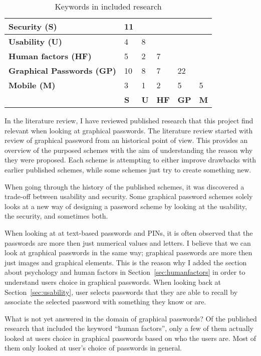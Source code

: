   \begin{table}[H]
      \centering
      \begin{tabular}{| p{4.7cm} | p{1cm} | p{1cm} | p{1cm} | p{1cm} | p{1cm} |}
        \hline
        {\bf Security (S)} & 11 & & & & \\ \hline
        {\bf Usability (U)} & 4 & 8 & & & \\ \hline
        {\bf Human factors (HF)} & 5 & 2 & 7 & & \\ \hline
        {\bf Graphical Passwords (GP)} & 10 & 8 & 7 & 22 & \\ \hline
        {\bf Mobile (M)} & 3 & 1 & 2 & 5 & 5 \\ \hline
         & {\bf S} & {\bf U} & {\bf HF} & {\bf GP} & {\bf M} \\ \hline
      \end{tabular}
      \caption{Keywords in included research}
      \label{tab:frequencyKeywords}
    \end{table}
    
  In the literature review, I have reviewed published research that this project find relevant when looking at graphical passwords. The literature review started with review of graphical password from an historical point of view. This provides an overview of the purposed schemes with the aim of understanding the reason why they were proposed. Each scheme is attempting to either improve drawbacks with earlier published schemes, while some schemes just try to create something new. 

  When going through the history of the published schemes, it was discovered a trade-off between usability and security. Some graphical password schemes solely looks at a new way of designing a password scheme by looking at the usability, the security, and sometimes both. 

  When looking at at text-based passwords and PINs, it is often observed that the passwords are more then just numerical values and letters. I believe that we can look at graphical passwords in the same way; graphical passwords are more then just images and graphical elements. This is the reason why I added the section about psychology and human factors in Section~\ref{sec:humanfactors} in order to understand users choice in graphical passwords. When looking back at Section~\ref{sec:usability}, user selects passwords that they are able to recall by associate the selected password with something they know or are. 

  What is not yet answered in the domain of graphical passwords? Of the published research that included the keyword ``human factors'', only a few of them actually looked at users choice in graphical passwords based on who the users are. Most of them only looked at user's choice of passwords in general.

